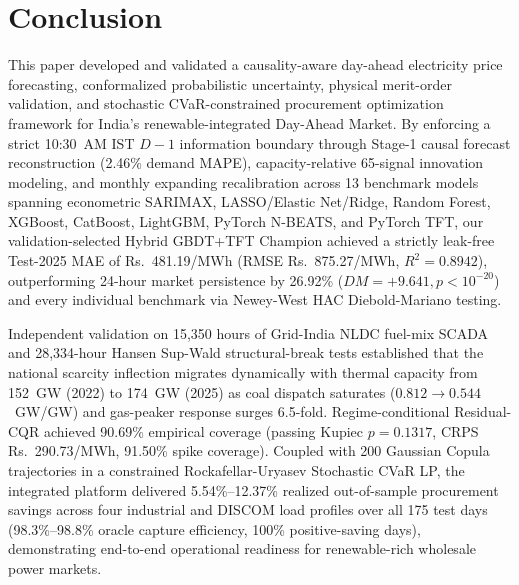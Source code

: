 \documentclass[journal,10pt,twocolumn]{IEEEtran}
\begin{document}
\section{Conclusion}
This paper developed and validated a causality-aware day-ahead electricity price forecasting, conformalized probabilistic uncertainty, physical merit-order validation, and stochastic CVaR-constrained procurement optimization framework for India's renewable-integrated Day-Ahead Market. By enforcing a strict 10:30~AM IST $D-1$ information boundary through Stage-1 causal forecast reconstruction (2.46\% demand MAPE), capacity-relative 65-signal innovation modeling, and monthly expanding recalibration across 13 benchmark models spanning econometric SARIMAX, LASSO/Elastic Net/Ridge, Random Forest, XGBoost, CatBoost, LightGBM, PyTorch N-BEATS, and PyTorch TFT, our validation-selected Hybrid GBDT+TFT Champion achieved a strictly leak-free Test-2025 MAE of Rs.~481.19/MWh (RMSE Rs.~875.27/MWh, $R^2 = 0.8942$), outperforming 24-hour market persistence by 26.92\% ($DM = +9.641, p < 10^{-20}$) and every individual benchmark via Newey-West HAC Diebold-Mariano testing.

Independent validation on 15,350 hours of Grid-India NLDC fuel-mix SCADA and 28,334-hour Hansen Sup-Wald structural-break tests established that the national scarcity inflection migrates dynamically with thermal capacity from 152~GW (2022) to 174~GW (2025) as coal dispatch saturates ($0.812 \to 0.544$~GW/GW) and gas-peaker response surges 6.5-fold. Regime-conditional Residual-CQR achieved 90.69\% empirical coverage (passing Kupiec $p = 0.1317$, CRPS Rs.~290.73/MWh, 91.50\% spike coverage). Coupled with 200 Gaussian Copula trajectories in a constrained Rockafellar-Uryasev Stochastic CVaR LP, the integrated platform delivered 5.54\%--12.37\% realized out-of-sample procurement savings across four industrial and DISCOM load profiles over all 175 test days (98.3\%--98.8\% oracle capture efficiency, 100\% positive-saving days), demonstrating end-to-end operational readiness for renewable-rich wholesale power markets.




\end{document}
